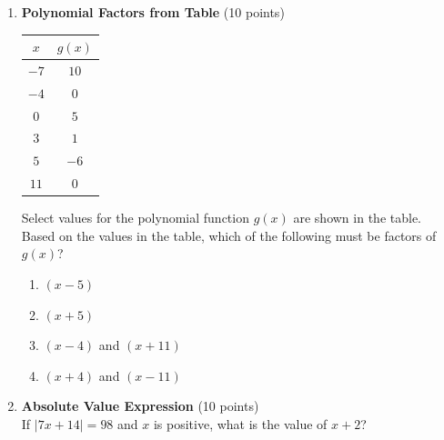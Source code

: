 \begin{enumerate}
  \newpage

  \item \textbf{Polynomial Factors from Table} (10 points)\\
  \begin{table}[h!]
  \centering
  \renewcommand{\arraystretch}{1.3}
  \setlength{\tabcolsep}{16pt}
  \begin{tabular}{|c|c|}
  \hline $x$ & $g(x)$ \\
  \hline $-7$ & $10$ \\
  \hline $-4$ & $0$ \\
  \hline $0$ & $5$ \\
  \hline $3$ & $1$ \\
  \hline $5$ & $-6$ \\
  \hline $11$ & $0$ \\
  \hline
  \end{tabular}
  \end{table}
  Select values for the polynomial function $g(x)$ are shown in the table. Based on the values in the table, which of the following must be factors of $g(x)$?
  \begin{enumerate}[label=\Alph*.]
    \item $(x-5)$
    \item $(x+5)$
    \item $(x-4)$ and $(x+11)$
    \item $(x+4)$ and $(x-11)$
  \end{enumerate}
  \begin{subanswer}
  \end{subanswer}


  \newpage



  
  \item \textbf{Absolute Value Expression} (10 points)\\
  If $|7x+14|=98$ and $x$ is positive, what is the value of $x+2$?
  \begin{subanswer}
  \end{subanswer}


\end{enumerate}
